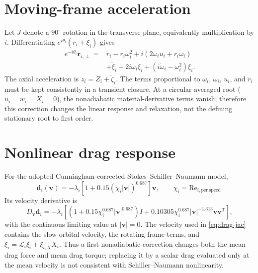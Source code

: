 \documentclass[11pt]{article}
\begin{document}
\section{Moving-frame acceleration}
Let $J$ denote a $90^\circ$ rotation in the transverse plane, equivalently
multiplication by $i$.  Differentiating $e^{i\theta_i}(r_i+\xi_i)$ gives
\begin{align}
 e^{-i\theta_i}\ddot{\mathbf r}_{i,\perp}
 ={}&\ddot r_i-r_i\omega_i^2
 +i(2\omega_i u_i+r_i\dot\omega_i)\\
 &+\ddot\xi_i+2i\omega_i\dot\xi_i
 +(i\dot\omega_i-\omega_i^2)\xi_i.
 \label{eq:rot-accel}
\end{align}
The axial acceleration is $\ddot z_i=\ddot Z_i+\ddot\zeta_i$.  The terms
proportional to $\omega_i$, $\dot\omega_i$, $u_i$, and $\ddot r_i$ must be
kept consistently in a transient closure.  At a circular averaged root
($u_i=w_i=\dot X_i=0$), the nonadiabatic material-derivative terms vanish;
therefore this correction changes the linear response and relaxation, not
the defining stationary root to first order.

\section{Nonlinear drag response}
For the adopted Cunningham-corrected Stokes--Schiller--Naumann model,
\begin{equation}
 \mathbf d_i(\mathbf v)=-\lambda_i\left[1+0.15(\chi_i|\mathbf v|)^{0.687}\right]\mathbf v,
 \qquad \chi_i=\mathrm{Re}_{i,\mathrm{per\ speed}}.
\end{equation}
Its velocity derivative is
\begin{equation}
 D_{\mathbf v}\mathbf d_i=-\lambda_i\left[
 (1+0.15\chi_i^{0.687}|\mathbf v|^{0.687})I
 +0.10305\chi_i^{0.687}|\mathbf v|^{-1.313}
   \mathbf v\mathbf v^{\mathsf T}\right],
 \label{eq:drag-jac}
\end{equation}
with the continuous limiting value at $|\mathbf v|=0$.  The velocity used in
\eqref{eq:drag-jac} contains the slow orbital velocity, the rotating-frame
terms, and $\dot\xi_i=\mathcal L_i\xi_i+\xi_{i,X}\dot X_i$.  Thus a first
nonadiabatic correction changes both the mean drag force and mean drag torque;
replacing it by a scalar drag evaluated only at the mean velocity is not
consistent with Schiller--Naumann nonlinearity.
\end{document}
